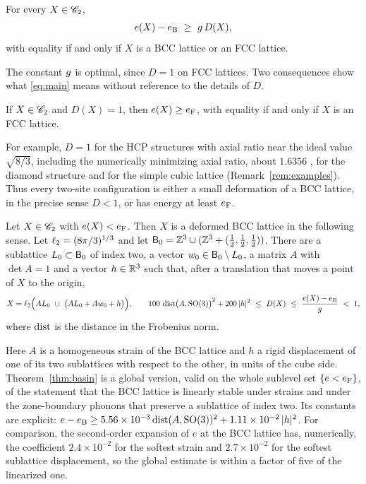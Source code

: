 \begin{theorem}\label{thm:main}
For every $X\in\mathscr C_2$,
\begin{equation}\label{eq:main}
  e(X)-e_{\mathrm B}\ \ge\ g\,D(X),
\end{equation}
with equality if and only if $X$ is a BCC lattice or an FCC lattice.
\end{theorem}

The constant $g$ is optimal, since $D=1$ on FCC lattices. Two consequences show what \eqref{eq:main} means without reference to the
details of $D$.

\begin{corollary}\label{cor:fcc}
If $X\in\mathscr C_2$ and $D(X)=1$, then $e(X)\ge e_{\mathrm F}$, with equality if and only if $X$ is an FCC lattice.
\end{corollary}

For example, $D=1$ for the HCP structures with axial ratio near the ideal value $\sqrt{8/3}$, including the numerically minimizing
axial ratio, about $1.6356$ \cite{Sholl1967,Kozhberov2018}, for the diamond structure and for the simple cubic lattice
(Remark~\ref{rem:examples}). Thus every two-site configuration is either a small deformation of a BCC lattice, in the precise sense
$D<1$, or has energy at least $e_{\mathrm F}$.

\begin{theorem}\label{thm:basin}
Let $X\in\mathscr C_2$ with $e(X)<e_{\mathrm F}$. Then $X$ is a deformed BCC lattice in the following sense. Let $\ell_2=(8\pi/3)^{1/3}$ and let
$\mathsf B_0=\mathbb Z^3\cup(\mathbb Z^3+(\frac12,\frac12,\frac12))$. There are a sublattice $L_0\subset\mathsf B_0$ of index two, a vector $w_0\in\mathsf B_0\setminus L_0$, a
matrix $A$ with $\det A=1$ and a vector $h\in\mathbb R^3$ such that, after a translation that moves a point of $X$ to the origin,
\[
  X=\ltwo\Bigl(AL_0\ \cup\ \bigl(AL_0+Aw_0+h\bigr)\Bigr),\qquad
  100\,\dist\bigl(A,\SO(3)\bigr)^2+200\,|h|^2\ \le\ D(X)\ \le\ \frac{e(X)-\eB}{\gap}\ <\ 1 ,
\]
where $\operatorname{dist}$ is the distance in the Frobenius norm.
\end{theorem}

Here $A$ is a homogeneous strain of the BCC lattice and $h$ a rigid displacement of one of its two sublattices with respect to the
other, in units of the cube side. Theorem~\ref{thm:basin} is a global version, valid on the whole sublevel set $\{e<e_{\mathrm F}\}$, of the
statement that the BCC lattice is linearly stable under strains and under the zone-boundary phonons that preserve a sublattice of
index two. Its constants are explicit: $e-e_{\mathrm B}\ge5.56\times10^{-3}\operatorname{dist}(A,\mathrm{SO}(3))^2+1.11\times10^{-2}\,|h|^2$. For comparison, the
second-order expansion of $e$ at the BCC lattice has, numerically, the coefficient $2.4\times10^{-2}$ for the softest strain and
$2.7\times10^{-2}$ for the softest sublattice displacement, so the global estimate is within a factor of five of the linearized one.

